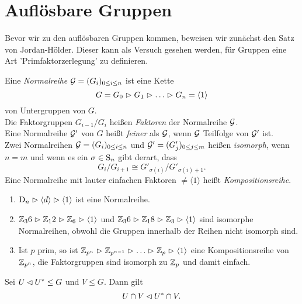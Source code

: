 \section{Aufl\"osbare Gruppen}

Bevor wir zu den aufl\"osbaren Gruppen kommen, beweisen wir zun\"achst den Satz von Jordan-H\"older. Dieser kann als Versuch gesehen werden, f\"ur Gruppen eine Art 'Primfaktorzerlegung' zu definieren.

\begin{definition}
 Eine \emph{Normalreihe} $\mathcal{G}=(G_i)_{0\leq i \leq n}$ ist eine Kette $$G=G_0 \vartriangleright G_1\vartriangleright \ldots\vartriangleright G_n=\langle 1 \rangle$$ von Untergruppen von $G$.\\
Die Faktorgruppen $G_{i-1}/G_i$ hei\ss{}en \emph{Faktoren} der Normalreihe $\mathcal{G}$.\\
Eine Normalreihe $\mathcal{G}'$ von $G$ hei\ss{}t \emph{feiner} als $\mathcal{G}$, wenn $\mathcal{G}$ Teilfolge von $\mathcal{G}'$ ist.\\
Zwei Normalreihen $\mathcal{G} = (G_i)_{0\leq i\leq n}$ und $\mathcal{G}'=(G'_j)_{0\leq j\leq m}$ hei\ss{}en \emph{isomorph}, wenn $n=m$ und wenn es ein $\sigma\in \operatorname{S}_n$ gibt derart, dass $$G_i/G_{i+1}\cong G'_{\sigma(i)}/G'_{\sigma(i)+1}.$$
Eine Normalreihe mit lauter einfachen Faktoren $\neq \langle 1 \rangle$ hei\ss{}t \emph{Kompositionsreihe}.
\end{definition}

\begin{beispiel} \spspace
 \begin{enumerate}
 \item $\operatorname{D}_n \vartriangleright \langle d \rangle \vartriangleright \langle 1 \rangle$ ist eine Normalreihe.
 \item $\mathbb{Z}_36 \vartriangleright \mathbb{Z}_12 \vartriangleright \mathbb{Z}_6 \vartriangleright \langle 1 \rangle$ und $\mathbb{Z}_36\vartriangleright\mathbb{Z}_18\vartriangleright \mathbb{Z}_3\vartriangleright \langle 1 \rangle$ sind isomorphe Normalreihen, obwohl die Gruppen innerhalb der Reihen nicht isomorph sind.
 \item Ist $p$ prim, so ist $\mathbb{Z}_{p^n}\vartriangleright\mathbb{Z}_{p^{n-1}}\vartriangleright\ldots\vartriangleright\mathbb{Z}_p\vartriangleright\langle 1 \rangle$ eine Kompositionsreihe von $\mathbb{Z}_{p^n}$, die Faktorgruppen sind isomorph zu $\mathbb{Z}_p$ und damit einfach. 
\end{enumerate}

\end{beispiel}

\begin{bemerkung} \label{6.3}
 Sei $U\lhd U^*\leq G$ und $V\leq G$. Dann gilt
$$U\cap V \lhd U^*\cap V.$$
\end{bemerkung}


